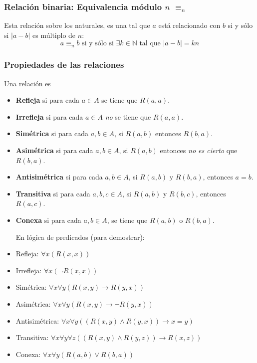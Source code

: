 \begin{multicols}{2}
    \subsubsection*{Relación binaria: Equivalencia módulo $n$ $\equiv_n$}
    Esta relación sobre los naturales, es una tal que $a$ está relacionado con $b$ si y sólo si $|a - b|$ es múltiplo de $n$:
    $$
    a \equiv_n b \text{ si y sólo si } \exists k \in \mathbb{N} \text{ tal que } |a - b| = kn
    $$
    
    \subsubsection*{Propiedades de las relaciones}
    Una relación es
    \begin{itemize}
        \item \textbf{Refleja} si para cada $a \in A$ se tiene que $R(a,a)$.
        \item \textbf{Irrefleja} si para cada $a \in A$ \textit{no} se tiene que $R(a,a)$. 
        \item \textbf{Simétrica} si para cada $a,b \in A$, si $R(a,b)$ entonces $R(b,a)$.
        \item \textbf{Asimétrica} si para cada $a,b \in A$, si $R(a,b)$ entonces \textit{no es cierto} que $R(b,a)$.
        \item \textbf{Antisimétrica} si para cada $a,b \in A$, si $R(a,b)$ y $R(b,a)$, entonces $a = b$.
        \item \textbf{Transitiva} si para cada $a,b,c \in A$, si $R(a,b)$ y $R(b,c)$, entonces $R(a, c)$.
        \item \textbf{Conexa} si para cada $a,b \in A$, se tiene que $R(a,b)$ o $R(b,a)$. \p
        
        En lógica de predicados (para demostrar):
    \end{itemize}
    
    \begin{itemize}
        \item Refleja: $\forall x(R(x, x))$
        \item Irrefleja: $\forall x(\neg R(x,x))$
        \item Simétrica: $\forall x \forall y (R(x,y) \rightarrow R(y,x))$
        \item Asimétrica: $\forall x \forall y (R(x,y) \rightarrow \neg R(y,x))$
        \item Antisimétrica: $\forall x \forall y ((R(x,y) \wedge R(y,x)) \rightarrow x = y)$
        \item Transitiva: $\forall x \forall y \forall z ((R(x,y) \wedge R(y,z)) \rightarrow R(x, z))$
        \item Conexa: $\forall x \forall y (R(a,b) \vee R(b,a))$
    \end{itemize}
    

\end{multicols}
